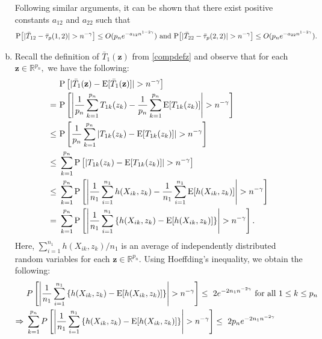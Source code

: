 \documentclass[twoside]{article}
\newcommand{\bz}{\mathbf{z}}
\newcommand{\0}{\mathbf{0}}
\newcommand{\1}{\mathbf{1}}
\numberwithin{equation}{section}
\begin{document}
\begin{enumerate}[(a)]
Following similar arguments, it can be shown that there exist positive constants $a_{12}$ and $a_{22}$ such that
\begin{align}\label{ref12}
{\rm P}\big [|\bar{T}_{12}-\bar{\tau}_p(1,2)|>n^{-\gamma} \big]\leq O(p_n e^{-a_{12} n^{1-2\gamma}})\text{ and } {\rm P}\big [|\bar{T}_{22}-\bar{\tau}_p(2,2)|>n^{-\gamma} \big]\leq O(p_n e^{-a_{22} n^{1-2\gamma}}).
\end{align}

 \item Recall the definition of $\bar{T}_{1}(\bz)$ from \eqref{compdefz} and observe that for each $\bz\in\mathbb{R}^{p_n},$ we have the following:
 \begin{align}\label{nref5}
    &\  {\rm P}\left [|\bar{T}_{1}(\bz)-{\rm E}[\bar{T}_{1}(\bz)]|>n^{-\gamma} \right ]\nonumber \\
     = &\  {\rm P}\left [\left |\frac{1}{p_n}\sum\limits_{k=1}^{p_n}T_{1k}(z_k)-\frac{1}{p_n}\sum\limits_{k=1}^{p_n}{\rm E}[T_{1k}(z_k)]\right |>n^{-\gamma}\right ]\nonumber \\
     \leq &\  {\rm P}\left [\frac{1}{p_n}\sum\limits_{k=1}^{p_n}\left |T_{1k}(z_k)-{\rm E}[T_{1k}(z_k)]\right |>n^{-\gamma} \right ]\nonumber \\
     \leq &\  \sum\limits_{k=1}^{p_n}{\rm P}\left [\left |T_{1k}(z_k)-{\rm E}[T_{1k}(z_k)]\right |>n^{-\gamma} \right ]\nonumber \\
     \leq &\  \sum\limits_{k=1}^{p_n}{\rm P}\left [\left |\frac{1}{n_1}\sum\limits_{i=1}^{n_1}h(X_{ik},z_k)-\frac{1}{n_1}\sum\limits_{i=1}^{n_1}{\rm E}[h(X_{ik},z_k)]\right |>n^{-\gamma}\right ]\nonumber \\
     = &\  \sum\limits_{k=1}^{p_n}{\rm P}\left [\left |\frac{1}{n_1}\sum\limits_{i=1}^{n_1}\left \{ h(X_{ik},z_k)-{\rm E}[h(X_{ik},z_k)]\right \}\right |>n^{-\gamma}\right ].
\end{align}
Here, $\sum_{i=1}^{n_1}h(X_{ik},z_k)/n_1$ is an average of independently distributed random variables for each $\bz\in\mathbb{R}^{p_n}$. Using Hoeffding's inequality, we obtain the following:
\begin{align}\label{nref6}
    &\ P\left [\left |\frac{1}{n_1} \sum_{i=1}^{n_1}\left \{h(X_{ik},z_k) - {\rm E}[h(X_{ik},z_k)]\right \}\right |> n^{-\gamma}\right ]\leq \ 2e^{-2n_1n^{-2\gamma}}\text{ for all }1\leq k\leq p_n\nonumber \\
    \Rightarrow &\ \sum\limits_{k=1}^{p_n} P\left [\left |\frac{1}{n_1} \sum_{i=1}^{n_1}\left \{ h(X_{ik},z_k) - {\rm E}[h(X_{ik},z_k)]\right \}\right |> n^{-\gamma}\right ]\leq \ 2p_ne^{-2n_1n^{-2\gamma}}\nonumber \\

\end{align}
\end{enumerate}
\end{document}
